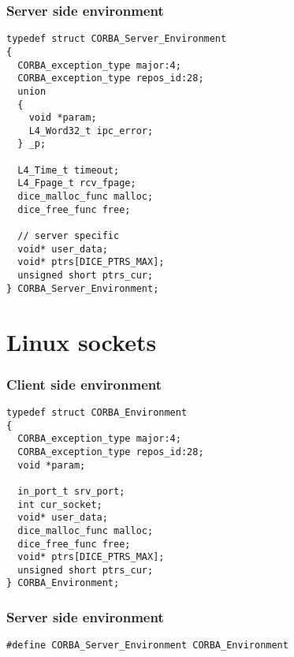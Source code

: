 \subsubsection{Server side environment}
\begin{verbatim}
typedef struct CORBA_Server_Environment
{
  CORBA_exception_type major:4;
  CORBA_exception_type repos_id:28;
  union
  {
    void *param;
    L4_Word32_t ipc_error;
  } _p;
  
  L4_Time_t timeout;
  L4_Fpage_t rcv_fpage;
  dice_malloc_func malloc;
  dice_free_func free;
  
  // server specific
  void* user_data;
  void* ptrs[DICE_PTRS_MAX];
  unsigned short ptrs_cur;
} CORBA_Server_Environment;
\end{verbatim}

\section{Linux sockets}

\subsubsection{Client side environment}
\begin{verbatim}
typedef struct CORBA_Environment
{
  CORBA_exception_type major:4;
  CORBA_exception_type repos_id:28;
  void *param;

  in_port_t srv_port;
  int cur_socket;
  void* user_data;
  dice_malloc_func malloc;
  dice_free_func free;
  void* ptrs[DICE_PTRS_MAX];
  unsigned short ptrs_cur;
} CORBA_Environment;		    
\end{verbatim}

\subsubsection{Server side environment}
\begin{verbatim}
#define CORBA_Server_Environment CORBA_Environment
\end{verbatim}

